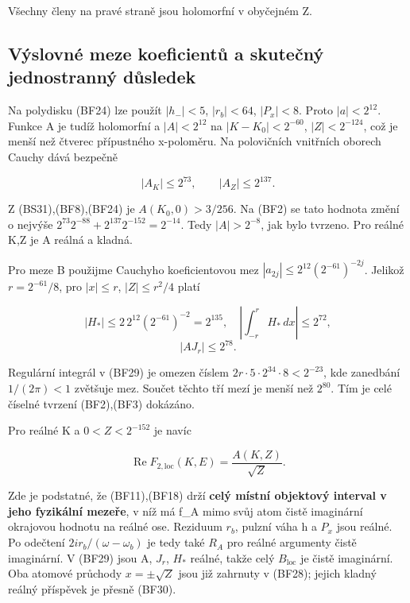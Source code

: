 \documentclass[11pt,a4paper]{article}
\theoremstyle{remark}\newtheorem{remark}[theorem]{Poznámka}
\numberwithin{equation}{section}
\begin{document}
Všechny členy na pravé straně jsou holomorfní v obyčejném Z.

\hypertarget{vuxfdslovnuxe9-meze-koeficientux16f-a-skuteux10dnuxfd-jednostrannuxfd-dux16fsledek}{%
\subsection{Výslovné meze koeficientů a skutečný jednostranný
důsledek}\label{vuxfdslovnuxe9-meze-koeficientux16f-a-skuteux10dnuxfd-jednostrannuxfd-dux16fsledek}}

Na polydisku (BF24) lze použít \(|h_-|<5\), \(|r_b|<64\), \(|P_x|<8\).
Proto \(|a|<2^{12}\). Funkce A je tudíž holomorfní a \(|A|<2^{12}\) na
\(|K-K_0|<2^{-60}\), \(|Z|<2^{-124}\), což je menší než čtverec
přípustného x-poloměru. Na polovičních vnitřních oborech Cauchy dává
bezpečně

\[
|A_K|\le2^{73},\qquad |A_Z|\le2^{137}.
\]

Z (BS31),(BF8),(BF24) je \(A(K_0,0)>3/256\). Na (BF2) se tato hodnota
změní o nejvýše \(2^{73}2^{-88}+2^{137}2^{-152}=2^{-14}\). Tedy
\(|A|>2^{-8}\), jak bylo tvrzeno. Pro reálné K,Z je A reálná a kladná.

Pro meze B použijme Cauchyho koeficientovou mez
\(|a_{2j}|\le2^{12}(2^{-61})^{-2j}\). Jelikož \(r=2^{-61}/8\), pro
\(|x|\le r\), \(|Z|\le r^2/4\) platí

\[
|H_*|\le2\,2^{12}(2^{-61})^{-2}=2^{135},
\quad
\left|\int_{-r}^rH_*\,dx\right|\le2^{72},
\] \[
|A J_r|\le2^{78}.
\]

Regulární integrál v (BF29) je omezen číslem
\(2r\cdot5\cdot2^{34}\cdot8<2^{-23}\), kde zanedbání \(1/(2\pi)<1\)
zvětšuje mez. Součet těchto tří mezí je menší než \(2^{80}\). Tím je
celé číselné tvrzení (BF2),(BF3) dokázáno.

Pro reálné K a \(0<Z<2^{-152}\) je navíc

\[
\boxed{\operatorname{Re}F_{2,\mathrm{loc}}(K,E)
=\frac{A(K,Z)}{\sqrt Z}.}
\tag{BF30}
\]

Zde je podstatné, že (BF11),(BF18) drží \textbf{celý místní objektový
interval v jeho fyzikální mezeře}, v níž má f\_A mimo svůj atom čistě
imaginární okrajovou hodnotu na reálné ose. Reziduum \(r_b\), pulzní
váha h a \(P_x\) jsou reálné. Po odečtení \(2ir_b/(\omega-\omega_b)\) je
tedy také \(R_A\) pro reálné argumenty čistě imaginární. V (BF29) jsou
A, \(J_r\), \(H_*\) reálné, takže celý \(B_{\mathrm{loc}}\) je čistě
imaginární. Oba atomové průchody \(x=\pm\sqrt Z\) jsou již zahrnuty v
(BF28); jejich kladný reálný příspěvek je přesně (BF30).
\end{document}
